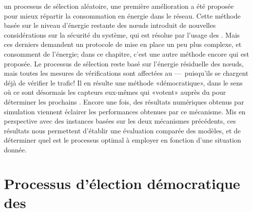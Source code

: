 \vfill
{} un processus de sélection aléatoire, une première amélioration a été proposée pour mieux répartir la consommation en énergie dans le réseau.
Cette méthode basée sur le niveau d'énergie restante des nœuds introduit de nouvelles considérations sur la sécurité du système, qui est résolue par l'usage des \vns.
Mais ces derniers demandent un protocole de mise en place un peu plus complexe, et consomment de l'énergie; dans ce chapitre, c'est une autre méthode encore qui est proposée.
\vfill
Le processus de sélection reste basé sur l'énergie résiduelle des nœuds, mais toutes les mesures de vérifications sont affectées au \cns ---~puisqu'ils se chargent déjà de vérifier le trafic!
Il en résulte une méthode «démocratique», dans le sens où ce sont désormais les capteurs eux-mêmes qui «votent» auprès du \ch pour déterminer les prochains \cns.
Encore une fois, des résultats numériques obtenus par simulation viennent éclairer les performances obtenues par ce mécanisme.
Mis en perspective avec des instances basées sur les deux mécanismes précédents, ces résultats nous permettent d'établir une évaluation comparée des modèles, et de déterminer quel est le processus optimal à employer en fonction d'une situation donnée.
\vfill

\pagebreak %
\section{Processus d'élection démocratique des \cns}\label{sd:sec:proposal}

